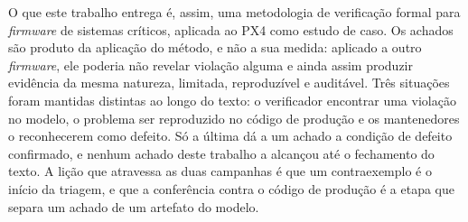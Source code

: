 O que este trabalho entrega é, assim, uma metodologia de verificação formal
para \textit{firmware} de sistemas críticos, aplicada ao PX4 como estudo de
caso. Os achados são produto da aplicação do método, e não a sua medida:
aplicado a outro \textit{firmware}, ele poderia não revelar violação alguma e
ainda assim produzir evidência da mesma natureza, limitada, reproduzível e
auditável. Três situações foram mantidas distintas ao longo do texto: o verificador encontrar uma violação no modelo, o problema ser reproduzido no código de produção e os mantenedores o reconhecerem como defeito. Só a última dá a um achado a condição de defeito confirmado, e nenhum achado deste trabalho a alcançou até o fechamento do texto. A lição que atravessa as duas campanhas é que um contraexemplo é o
início da triagem, e que a conferência contra o código de produção é a etapa
que separa um achado de um artefato do modelo.
